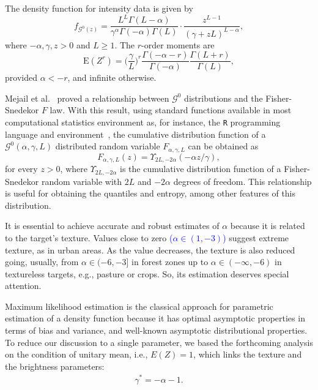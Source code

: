 \documentclass[twocolumn]{svjour3}
\begin{document}
	The density function for intensity data is given by
	\begin{equation}
	f_{\mathcal{G}^{0}(z)} =\frac{L^{L}\Gamma ( L-\alpha
		) }{\gamma ^{\alpha }\Gamma ( -\alpha ) \Gamma (
		L) }\cdot  
	\frac{z^{L-1}}{( \gamma +zL) ^{L-\alpha }},%
	\label{ec_dens_gI0}
	\end{equation}
	where $-\alpha,\gamma ,z>0$ and $L\geq 1$. 
	The $r$-order moments are
	\begin{equation}
	\text{E}(Z^r) =\Big(\frac{\gamma}{L}\Big)^r\frac{\Gamma ( -\alpha-r )}{ \Gamma (-\alpha) }
	\frac{\Gamma (L+r )}{\Gamma (L)},
	\label{moments_gI0}
	\end{equation}
	provided $\alpha<-r$, and infinite otherwise.
	
	Mejail et al.~\cite{MejailJacoboFreryBustos:IJRS} proved a relationship between $\mathcal G^0$ distributions and the Fisher-Snedekor $F$ law.
	With this result, using standard functions available in most computational statistics environment as, for instance, the \texttt R programming language and environment~\cite{RLanguage}, the cumulative distribution function of a $\mathcal G^0(\alpha,\gamma,L)$ distributed random variable $F_{\alpha,\gamma,L}$ can be obtained as
	\begin{equation}
	F_{\alpha,\gamma,L}(z) = \Upsilon_{2L, -2\alpha}(-\alpha  z / \gamma),
	\label{eq:CDFG0}
	\end{equation}
	for every $z>0$, where $\Upsilon_{2L, -2\alpha}$ is the cumulative distribution function of a Fisher-Snedekor random variable with $2L$ and $-2\alpha$ degrees of freedom.
	This relationship is useful for obtaining the quantiles and entropy, among other features of this distribution.
	
	It is essential to achieve accurate and robust estimates of $\alpha$ because it is related to the target's texture. 
	Values close to zero \textcolor{blue}{($\alpha \in (1,-3)$)} suggest extreme texture, as in urban areas. 
	As the value decreases, the texture is also reduced going, usually, from $\alpha \in (-6,-3]$ in forest zones up to $\alpha\in(-\infty,-6)$ in textureless targets, e.g., pasture or crops. So, its estimation deserves special attention.
	
	Maximum likelihood estimation is the classical approach for parametric estimation of a density function because it has optimal asymptotic properties in terms of bias and variance, and well-known asymptotic distributional properties.
	To reduce our discussion to a single parameter, we based the forthcoming analysis on the condition of unitary mean, i.e., $E(Z)=1$, which links the texture and the brightness parameters:
	\begin{align}
	\label{RelationAlphaGamma}
	\gamma^* =-\alpha-1.
	\end{align}
	
\end{document}
